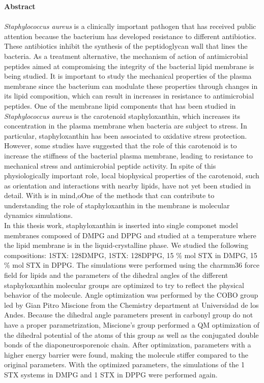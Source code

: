 \textbf{\LARGE Abstract}\\\\
\textit{Staphylococcus aureus} is a clinically important pathogen that has received public attention because the bacterium has developed resistance to different antibiotics. These antibiotics inhibit the synthesis of the peptidoglycan wall that lines the bacteria. As a treatment alternative, the mechanism of action of antimicrobial peptides aimed at compromising the integrity of the bacterial lipid membrane is being studied. It is important to study the mechanical properties of the plasma membrane since the bacterium can modulate these properties through changes in its lipid composition, which can result in increases in resistance to antimicrobial peptides. One of the membrane lipid components that has been studied in \textit{Staphylococcus aureus} is the carotenoid staphyloxanthin, which increases its concentration in the plasma membrane when bacteria are subject to stress. In particular, staphyloxanthin has been associated to oxidative stress protection. However, some studies have suggested that the role of this carotenoid is to increase the stiffness of the bacterial plasma membrane, leading to resistance to mechanical stress and antimicrobial peptide activity. In spite of this physiologically important role, local biophysical properties of the carotenoid, such as orientation and interactions with nearby lipids, have not yet been studied in detail. With is in mind,oOne of the methods that can contribute to understanding the role of staphyloxanthin in the membrane is molecular dynamics simulations.\\
In this thesis work, staphyloxanthin is inserted into single componet model membranes composed of DMPG and DPPG and studied at a temperature where the lipid membrane is in the liquid-crystalline phase. We studied the following compositions: 1STX: 128DMPG, 1STX: 128DPPG, 15 \% mol STX in DMPG, 15 \% mol STX in DPPG. The simulations were performed using the charmm36 force field for lipids and the parameters of the dihedral angles of the different staphyloxanthin molecular groups are optimized to try to reflect the physical behavior of the molecule. Angle optimization was performed by the COBO group led by Gian Pitro Miscione from the Chemistry department at Universidad de los Andes. Because the dihedral angle  parameters present in carbonyl group do not have a proper parametrization, Miscione's group performed a QM optimization of the dihedral potential of the atoms of this group as well as the conjugated double bonds of the diaponeurosporenoic chain. After optimization, parameters with a higher energy barrier were found, making the molecule stiffer compared to the original parameters. With the optimized parameters, the simulations of the 1 STX systems in DMPG and 1 STX in DPPG were performed again. \\
